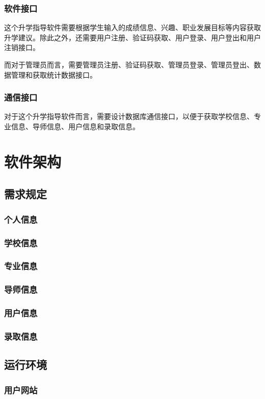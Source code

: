 \documentclass[UTF8]{ctexart}
\begin{document}
    \subsubsection{软件接口}
    这个升学指导软件需要根据学生输入的成绩信息、兴趣、职业发展目标等内容获取升学建议。除此之外，还需要用户注册、验证码获取、用户登录、用户登出和用户注销接口。

    而对于管理员而言，需要管理员注册、验证码获取、管理员登录、管理员登出、数据管理和获取统计数据接口。
    \subsubsection{通信接口}
    对于这个升学指导软件而言，需要设计数据库通信接口，以便于获取学校信息、专业信息、导师信息、用户信息和录取信息。

    \section{软件架构}
    \subsection{需求规定}
    \subsubsection{个人信息}
    \subsubsection{学校信息}
    \subsubsection{专业信息}
    \subsubsection{导师信息}
    \subsubsection{用户信息}
    \subsubsection{录取信息}

    \subsection{运行环境}
    \subsubsection{用户网站}
\end{document}
